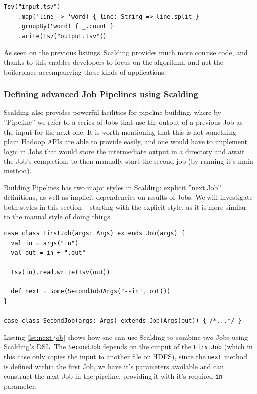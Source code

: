 \begin{lstlisting}[caption={Simplest Scalding job used in Oculus -- each frame perceptual hashing}, label={lst:simplest-scalding-job}]
  Tsv("input.tsv")
    .map('line -> 'word) { line: String => line.split }
    .groupBy('word) { _.count }
    .write(Tsv("output.tsv"))
\end{lstlisting}

As seen on the previous listings, Scalding provides much more concise code, and thanks to this enables developers to focus on the algorithm, and not the boilerplace accompanying these kinds of applications.

\subsubsection{Defining advanced Job Pipelines using Scalding}
Scalding also provides powerful facilities for pipeline building, where by ''Pipeline'' we refer to a series of Jobs that use the output of a previous Job as the input for the next one. It is worth mentioning that this is not something plain Hadoop APIs are able to provide easily, and one would have to implement logic in Jobs that would store the intermediate output in a directory and await the Job's completion, to then manually start the second job (by running it's main method).

Building Pipelines has two major styles in Scalding: explicit ''next Job'' definitions, as well as implicit dependencies on results of Jobs. We will investigate both styles in this section -- starting with the explicit style, as it is more similar to the manual style of doing things.

\begin{lstlisting}[caption={Explicit ''next job'' definition within a Scalding Job class}, label={lst:next-job}]
case class FirstJob(args: Args) extends Job(args) {
  val in = args("in")
  val out = in + ".out"
  
  Tsv(in).read.write(Tsv(out))
  
  def next = Some(SecondJob(Args("--in", out)))
}

case class SecondJob(args: Args) extends Job(Args(out)) { /*...*/ }
\end{lstlisting}

Listing \ref{lst:next-job} shows how one can use Scalding to combine two Jobs using Scalding's DSL. The \verb|SecondJob| depends on the output of the \verb|FirstJob| (which in this case only copies the input to another file on HDFS), since the \verb|next| method is defined within the first Job, we have it's parameters available and can construct the next Job in the pipeline, providing it with it's required \verb|in| parameter. 


